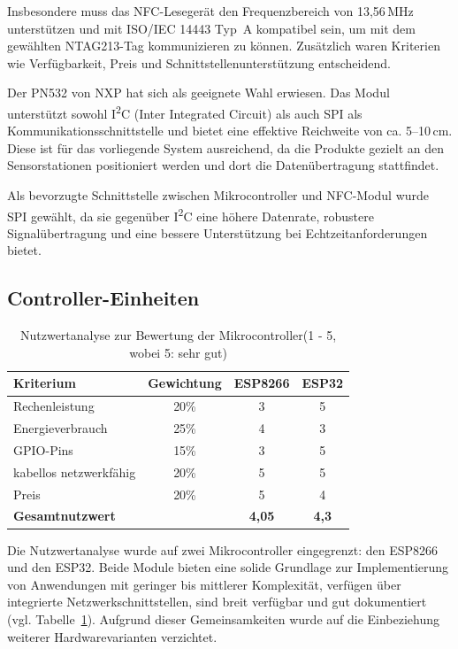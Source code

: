 Insbesondere muss das NFC-Lesegerät den Frequenzbereich von 13{,}56\,MHz unterstützen und mit ISO/IEC 14443 Typ~A kompatibel sein, um mit dem gewählten NTAG213-Tag kommunizieren zu können. Zusätzlich waren Kriterien wie Verfügbarkeit, Preis und Schnittstellenunterstützung entscheidend.

Der PN532 von NXP hat sich als geeignete Wahl erwiesen. Das Modul unterstützt sowohl I\textsuperscript{2}C (Inter Integrated Circuit) als auch SPI als Kommunikationsschnittstelle und bietet eine effektive Reichweite von ca. 5–10\,cm. Diese ist für das vorliegende System ausreichend, da die Produkte gezielt an den Sensorstationen positioniert werden und dort die Datenübertragung stattfindet.

Als bevorzugte Schnittstelle zwischen Mikrocontroller und NFC-Modul wurde SPI gewählt, da sie gegenüber I\textsuperscript{2}C eine höhere Datenrate, robustere Signalübertragung und eine bessere Unterstützung bei Echtzeitanforderungen bietet.


\subsection{Controller-Einheiten}

\begin{table}[H]
	\centering
	\caption{Nutzwertanalyse zur Bewertung der Mikrocontroller(1 - 5, wobei 5: sehr gut)}
	\label{tab:nwa_ctrl}
	\begin{tabular}{|l|c|c|c|}
		\hline
		\textbf{Kriterium} & \textbf{Gewichtung} & \textbf{ESP8266} & \textbf{ESP32} \\ \hline
		Rechenleistung          & 20\% & 3 & 5 			\\ \hline
		Energieverbrauch        & 25\% & 4 & 3 		\\ \hline \hline
 		GPIO-Pins                     & 15\% & 3 & 5      \\ \hline
		kabellos netzwerkfähig	& 20\% & 5 & 5 	\\ \hline
		Preis                   & 20\% & 5 & 4 \\ \hline
		\textbf{Gesamtnutzwert} &       & \textbf{4,05} & \textbf{4,3} \\ \hline
	\end{tabular}
\end{table}

Die Nutzwertanalyse wurde auf zwei Mikrocontroller eingegrenzt: den ESP8266 und den ESP32. Beide Module bieten eine solide Grundlage zur Implementierung von Anwendungen mit geringer bis mittlerer Komplexität, verfügen über integrierte Netzwerkschnittstellen, sind breit verfügbar und gut dokumentiert (vgl. Tabelle~\ref{tab:nwa_ctrl}). Aufgrund dieser Gemeinsamkeiten wurde auf die Einbeziehung weiterer Hardwarevarianten verzichtet.

